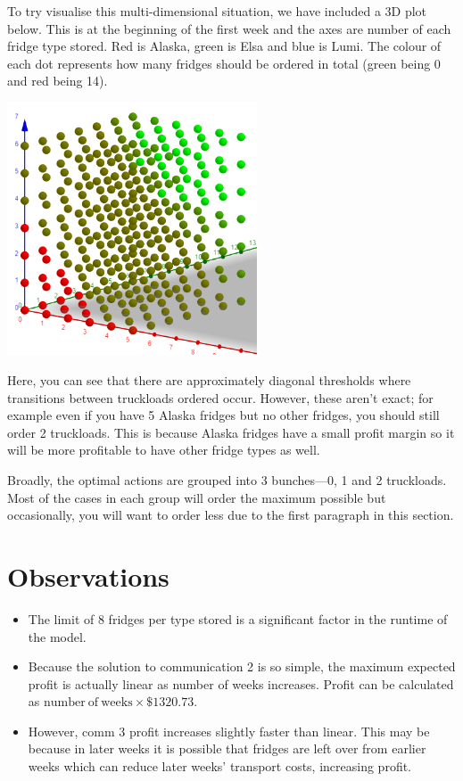 \documentclass[11pt,a4paper]{article}
\begin{document}
To try visualise this multi-dimensional situation, we have included a 3D plot below. 
This is at the beginning of the first week and the axes are number of each fridge type stored. Red is Alaska, green is Elsa 
and blue is Lumi. The colour of each dot represents how many fridges 
should be ordered in total (green being 0 and red being 14).
\begin{center}
\includegraphics[width=20em]{cube.png}
\end{center}
Here, you can see that there are approximately diagonal thresholds where 
transitions between truckloads ordered occur. However, these aren't exact; 
for example even if you have 5 Alaska fridges but no other fridges, you should 
still order 2 truckloads. This is because Alaska fridges have a small profit margin
so it will be more profitable to have other fridge types as well.

Broadly, the optimal actions are grouped into 3 bunches---0, 1 and 2 truckloads. 
Most of the cases in each group will order the maximum possible but 
occasionally, you will want to order less due to the first paragraph in this section.

\section{Observations}
\begin{itemize}
    \item The limit of 8 fridges per type stored is a significant factor 
    in the runtime of the model. 
    \item Because the solution to communication 2 is so simple, the maximum 
    expected profit is actually linear as number of weeks increases. 
    Profit can be calculated as $\mathrm{number\ of\ weeks} \times \$1320.73$.
    \item However, comm 3 profit increases slightly faster than linear. This may 
    be because in later weeks it is possible that fridges are left over from 
    earlier weeks which can reduce later weeks' transport costs, increasing profit.

\end{itemize}
\end{document}

